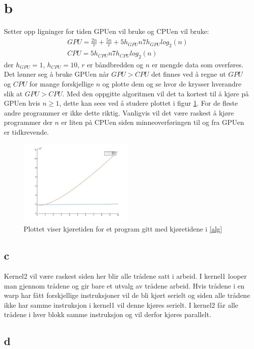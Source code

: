 \documentclass[12pt, a4paper]{article} %
\begin{document}
\section*{b}
Setter opp ligninger for tiden GPUen vil bruke og CPUen vil bruke:
\begin{align}
GPU=\frac{2n}{r}+\frac{5n}{r}+5h_{GPU}n7h_{GPU}log_2(n) \nonumber \\
CPU=5h_{CPU}n7h_{CPU}log_2(n)
\label{alg}
\end{align}
der $h_{GPU}=1$, $h_{CPU}=10$, $r$ er båndbredden og $n$ er mengde data som overføres. Det lønner seg å bruke GPUen når $GPU>CPU$ det finnes ved å regne ut $GPU$ og $CPU$ for mange forskjellige $n$ og plotte dem og se hvor de krysser hverandre slik at $GPU>CPU$.
 Med den oppgitte algoritmen vil det ta kortest til å kjøre på GPUen hvis $n \geqslant 1$, dette kan sees ved å studere plottet i figur \ref{GPU-CPU}. For de fleste andre programmer er ikke dette riktig. Vanligvis vil det være raskest å kjøre programmer der $n$ er liten på CPUen siden minneoverføringen til og fra GPUen er tidkrevende. 
\begin{figure}
\centering
\includegraphics[width=0.5\textwidth]{GPU-CPU.jpg} 
\caption{Plottet viser kjøretiden for et program gitt med kjøretidene i \eqref{alg}}
\label{GPU-CPU}
\end{figure}

\subsection*{c}
Kernel2 vil være raskest siden her blir alle trådene satt i arbeid. I kernel1 looper man gjennom trådene og gir bare et utvalg av trådene arbeid. Hvis trådene i en warp har fått forskjellige instruksjoner vil de bli kjørt serielt og siden alle trådene ikke har samme instruksjon i kernel1 vil denne kjøres serielt. I kernel2 får alle trådene i hver blokk samme instruksjon og vil derfor kjøres parallelt.

\subsection*{d}
\end{document}
